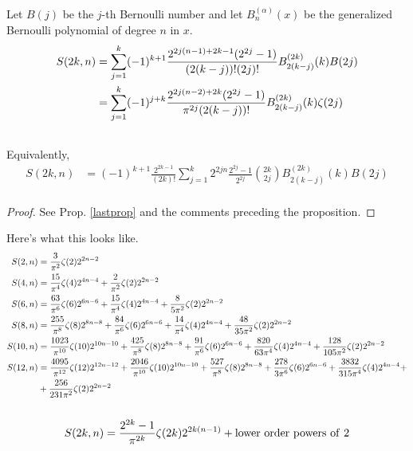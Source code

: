 \documentclass[fleqn,a4paper,9pt]{article}
\begin{document}
\begin{flushleft}
\begin{theorem}\label{theorem1}
 Let $B(j)$ be the $j$-th Bernoulli number and let $B_n^{(\alpha)}(x)$ be the generalized Bernoulli polynomial of degree $n$ in $x$.
\begin{align}\notag
S(2 k,n)&=\sum_{j=1}^k(-1)^{k+1}\frac{2^{2j(n-1)+2k-1}(2^{2j}-1)}{(2(k-j))!(2j)!}B_{2(k-j)}^{(2k)}(k) B(2 j)\\\notag
&=\sum_{j=1}^k(-1)^{j+k}\frac{2^{2j(n-2)+2k}(2^{2j}-1)}{\pi^{2j}(2(k-j))!}B_{2(k-j)}^{(2k)}(k) \zeta(2 j)\\\
\end{align}
Equivalently,
\begin{align}
S(2 k,n)&=(-1)^{k+1}\frac{2^{2k-1}}{(2k)!}\sum_{j=1}^k2^{2jn}\frac{2^{2j}-1}{2^{2j}}\binom{2k}{2j}B_{2(k-j)}^{(2k)}(k) B(2 j)\\\label{sumsine}
\end{align}
\end{theorem}
\begin{proof}
See Prop. \ref{lastprop} and the comments preceding the proposition.
\end{proof}
Here's what this looks like.
\begin{align}\notag
S(2,n)&=\frac{3}{\pi^2}\zeta(2)2^{2n-2}\\\notag
S(4,n)&=\frac{15}{\pi^4}\zeta(4)2^{4n-4}+\frac{2}{\pi^2}\zeta(2)2^{2n-2}\\\notag
S(6,n)&=\frac{63}{\pi^6}\zeta(6)2^{6n-6}+\frac{15}{\pi^4}\zeta(4)2^{4n-4}+\frac{8}{5\pi^2}\zeta(2)2^{2n-2}\\\notag
S(8,n)&=\frac{255}{\pi^8}\zeta(8)2^{8n-8}+\frac{84}{\pi^6}\zeta(6)2^{6n-6}+\frac{14}{\pi^4}\zeta(4)2^{4n-4}+\frac{48}{35\pi^2}\zeta(2)2^{2n-2}\\\notag
S(10,n)&=\frac{1023}{\pi^{10}}\zeta(10)2^{10n-10}+\frac{425}{\pi^8}\zeta(8)2^{8n-8}+\frac{91}{\pi^6}\zeta(6)2^{6n-6}+\frac{820}{63\pi^4}\zeta(4)2^{4n-4}+\frac{128}{105\pi^2}\zeta(2)2^{2n-2}\\\notag
S(12,n)&=\frac{4095}{\pi^{12}}\zeta(12)2^{12n-12}+\frac{2046}{\pi^{10}}\zeta(10)2^{10n-10}+\frac{527}{\pi^8}\zeta(8)2^{8n-8}+\frac{278}{3\pi^6}\zeta(6)2^{6n-6}+\frac{3832}{315\pi^4}\zeta(4)2^{4n-4}+\\\notag
&+\frac{256}{231\pi^2}\zeta(2)2^{2n-2}\\\notag
\end{align}
\begin{align}\notag
S(2k,n)&=\frac{2^{2k}-1}{\pi^{2k}}\zeta(2k)2^{2k(n-1)}+{\rm lower \ order\  powers\ of\  2}\\\notag

\end{align}
\end{flushleft}
\end{document}
